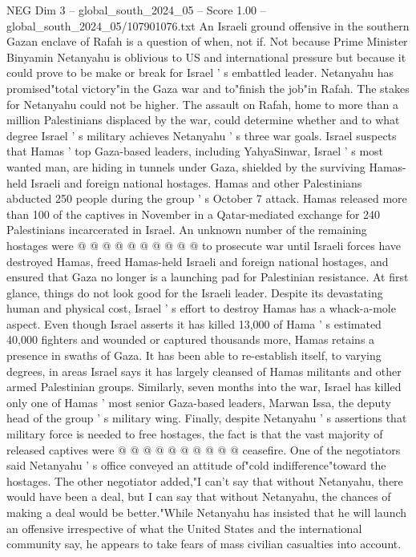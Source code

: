 \begin{textsample}{NEG Dim 3 – global\_south\_2024\_05 – Score 1.00 – global\_south\_2024\_05/107901076.txt}  \label{ex:f3_neg_351}
An Israeli ground offensive in the southern Gazan enclave of Rafah is a question of when, not if.
Not because Prime Minister Binyamin Netanyahu is oblivious to US and international pressure but because it could prove to be make or break for Israel ' s embattled leader.
Netanyahu has promised"total victory"in the Gaza war and to"finish the job"in Rafah.
The stakes for Netanyahu could not be higher.
The assault on Rafah, home to more than a million Palestinians displaced by the war, could determine whether and to what degree Israel ' s military achieves Netanyahu ' s three war goals.
Israel suspects that Hamas ' top Gaza-based leaders, including YahyaSinwar, Israel ' s most wanted man, are hiding in tunnels under Gaza, shielded by the surviving Hamas-held Israeli and foreign national hostages.
Hamas and other Palestinians abducted 250 people during the group ' s October 7 attack.
Hamas released more than 100 of the captives in November in a Qatar-mediated exchange for 240 Palestinians incarcerated in Israel.
An unknown number of the remaining hostages were @ @ @ @ @ @ @ @ @ @ to prosecute war until Israeli forces have destroyed Hamas, freed Hamas-held Israeli and foreign national hostages, and ensured that Gaza no longer is a launching pad for Palestinian resistance.
At first glance, things do not look good for the Israeli leader.
Despite its devastating human and physical cost, Israel ' s effort to destroy Hamas has a whack-a-mole aspect.
Even though Israel asserts it has killed 13,000 of Hama ' s estimated 40,000 fighters and wounded or captured thousands more, Hamas retains a presence in swaths of Gaza.
It has been able to re-establish itself, to varying degrees, in areas Israel says it has largely cleansed of Hamas militants and other armed Palestinian groups.
Similarly, seven months into the war, Israel has killed only one of Hamas ' most senior Gaza-based leaders, Marwan Issa, the deputy head of the group ' s military wing.
Finally, despite Netanyahu ' s assertions that military force is needed to free hostages, the fact is that the vast majority of released captives were @ @ @ @ @ @ @ @ @ @ ceasefire.
One of the negotiators said Netanyahu ' s office conveyed an attitude of"cold indifference"toward the hostages.
The other negotiator added,"I can't say that without Netanyahu, there would have been a deal, but I can say that without Netanyahu, the chances of making a deal would be better."While Netanyahu has insisted that he will launch an offensive irrespective of what the United States and the international community say, he appears to take fears of mass civilian casualties into account.

\end{textsample}
